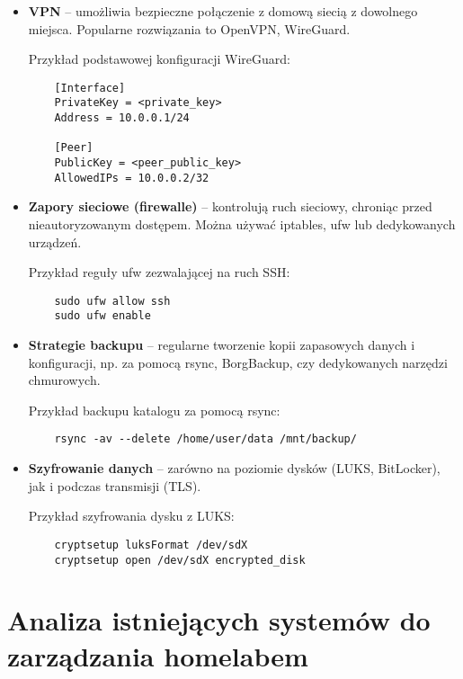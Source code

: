 \begin{itemize}
    \item \textbf{VPN} – umożliwia bezpieczne połączenie z domową siecią z dowolnego miejsca. Popularne rozwiązania to OpenVPN, WireGuard.
    
    Przykład podstawowej konfiguracji WireGuard:
    \begin{verbatim}
    [Interface]
    PrivateKey = <private_key>
    Address = 10.0.0.1/24

    [Peer]
    PublicKey = <peer_public_key>
    AllowedIPs = 10.0.0.2/32
    \end{verbatim}

    \item \textbf{Zapory sieciowe (firewalle)} – kontrolują ruch sieciowy, chroniąc przed nieautoryzowanym dostępem. Można używać iptables, ufw lub dedykowanych urządzeń.

    Przykład reguły ufw zezwalającej na ruch SSH:
    \begin{verbatim}
    sudo ufw allow ssh
    sudo ufw enable
    \end{verbatim}

    \item \textbf{Strategie backupu} – regularne tworzenie kopii zapasowych danych i konfiguracji, np. za pomocą rsync, BorgBackup, czy dedykowanych narzędzi chmurowych.

    Przykład backupu katalogu za pomocą rsync:
    \begin{verbatim}
    rsync -av --delete /home/user/data /mnt/backup/
    \end{verbatim}

    \item \textbf{Szyfrowanie danych} – zarówno na poziomie dysków (LUKS, BitLocker), jak i podczas transmisji (TLS).

    Przykład szyfrowania dysku z LUKS:
    \begin{verbatim}
    cryptsetup luksFormat /dev/sdX
    cryptsetup open /dev/sdX encrypted_disk
    \end{verbatim}
\end{itemize}

\section{Analiza istniejących systemów do zarządzania homelabem}
